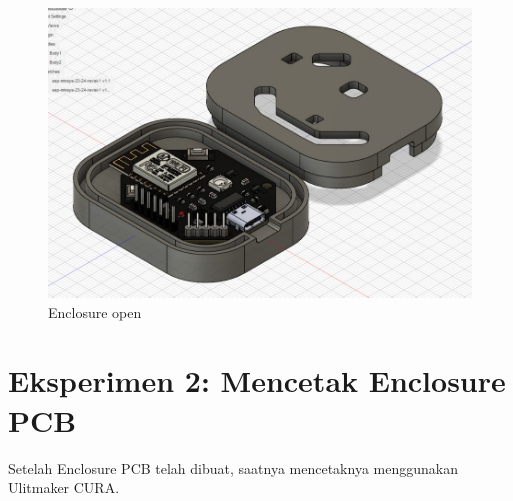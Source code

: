 \begin{figure}[H]
    \centering
    \includegraphics[width=0.5\linewidth]{P3/img/Enclosure Open 2.jpg}
    \caption{Enclosure open}
    \label{fig:Enclosure open}
\end{figure}
\section{Eksperimen 2: Mencetak Enclosure PCB}
Setelah Enclosure PCB telah dibuat, saatnya mencetaknya menggunakan Ulitmaker CURA. 
